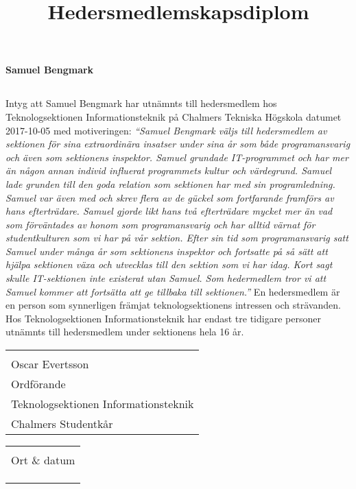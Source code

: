 \documentclass[11pt, noincludeaddress, nopagination]{classes/cthit}
\makeatletter
\newcommand{\sign}[4]{%
  \begin{tabular}[t]{@{}l@{}}
  \makebox[6.5cm]{\dotfill}\\
  \strut#1\strut \\
  \strut#2\strut \\
  \strut#3\strut \\
  \strut#4\strut \\
  \end{tabular}%
}
\makeatother
\begin{document}
\title{Hedersmedlemskapsdiplom}

\makeheadfoot%

\makesimpletitle
\begin{center}
\textbf{\Huge{Samuel Bengmark}}
\end{center}

\subsection*{}
Intyg att Samuel Bengmark har utnämnts till hedersmedlem hos Teknologsektionen Informationsteknik på Chalmers Tekniska Högskola datumet 2017-10-05 med motiveringen: 
\newline
\newline
\textit{
``Samuel Bengmark väljs till hedersmedlem av sektionen för sina extraordinära insatser under sina år som både programansvarig och även som sektionens inspektor. Samuel grundade IT-programmet och har mer än någon annan individ influerat programmets kultur och värdegrund. Samuel lade grunden till den goda relation som sektionen har med sin programledning. Samuel var även med och skrev flera av de gückel som fortfarande framförs av hans efterträdare. Samuel gjorde likt hans två efterträdare mycket mer än vad som förväntades av honom som programansvarig och har alltid värnat för studentkulturen som vi har på vår sektion. Efter sin tid som programansvarig satt Samuel under många år som sektionens inspektor och fortsatte på så sätt att hjälpa sektionen växa och utvecklas till den sektion som vi har idag. Kort sagt skulle IT-sektionen inte existerat utan Samuel. Som hedermedlem tror vi att Samuel kommer att fortsätta att ge tillbaka till sektionen.''}
\newline
\newline
En hedersmedlem är en person som synnerligen främjat teknologsektionens intressen och strävanden. Hos Teknologsektionen Informationsteknik har endast tre tidigare personer utnämnts till hedersmedlem under sektionens hela 16 år.

\vspace{2.5cm}
\noindent
  \begin{minipage}[t]{0.5\linewidth}
    \raggedright
    \sign{Oscar Evertsson}{Ordförande}{Teknologsektionen Informationsteknik}{Chalmers Studentkår}
  \end{minipage}%
  \hfill
  \begin{minipage}[t]{0.5\linewidth}
  \sign{Ort \& datum}{}{}{}
  \end{minipage}
\end{document}
